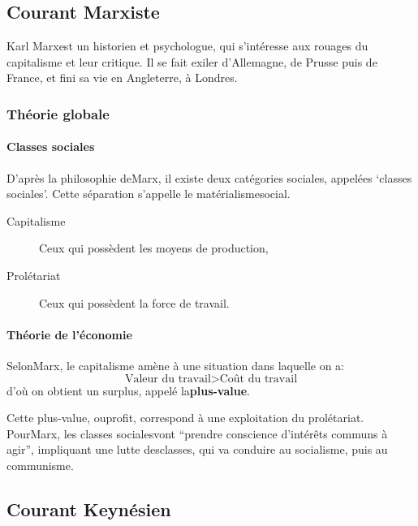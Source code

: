 \documentclass[10pt,a4paper,french]{article}
\begin{document}
\subsection{Courant Marxiste}

Karl Marxest un historien et psychologue, qui s’intéresse aux rouages du capitalisme et leur critique. Il se fait exiler d’Allemagne, de Prusse puis de France, et fini sa vie en Angleterre, à Londres.

\subsubsection{Théorie globale}

\paragraph{Classes sociales}
D’après la philosophie deMarx, il existe deux catégories sociales, appelées `classes sociales'. Cette séparation s’appelle le matérialismesocial.
\begin{description}
\item[Capitalisme] Ceux qui possèdent les moyens de production,
\item[Prolétariat] Ceux qui possèdent la force de travail.
\end{description}

\paragraph{Théorie de l'économie}
SelonMarx, le capitalisme amène à une situation dans laquelle on a: \[ \text{Valeur du travail} > \text{Coût du travail} \] d'où on obtient un surplus, appelé la\textbf{plus-value}.

Cette plus-value, ouprofit, correspond à une exploitation du prolétariat. PourMarx, les classes socialesvont ``prendre conscience d'intérêts communs à agir'', impliquant une lutte desclasses, qui va conduire au socialisme, puis au communisme.

\subsection{Courant Keynésien}
\end{document}
